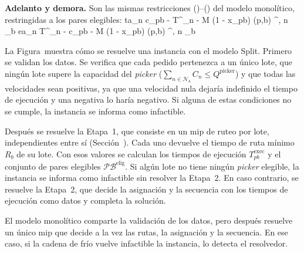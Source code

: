 {\bf Adelanto y demora.}
Son las mismas restricciones ()--()
del modelo monolítico, restringidas a los pares elegibles:
\startplaceformula
\startformula
	\startalign[n=3, align={right,left,left}]
		\NC \NC ta_n \geq c_{pb} - T^{}_n - M (1 - x_{pb}) \NC \qquad \forall (p,b) \in {}^{},\; n \in {}_b 
		\NC \NC ea_n \geq T^{}_n - c_{pb} - M (1 - x_{pb}) \NC \qquad \forall (p,b) \in {}^{},\; n \in {}_b 
	\stopalign
\stopformula
\stopplaceformula

\stopsubsection

\startsubsection[title={Resolución}, reference=sec:split_resolucion]

La Figura~ muestra cómo se resuelve una instancia con el
modelo Split.
Primero se validan los datos. Se verifica que cada pedido pertenezca a un
único lote, que ningún lote supere la capacidad del {\em picker}
($\sum_{n \in \mathcal{N}_b} C_n \leq Q^{\text{picker}}$) y que todas las
velocidades sean positivas, ya que una velocidad nula dejaría indefinido el
tiempo de ejecución y una negativa lo haría negativo. Si alguna de estas
condiciones no se cumple, la instancia se informa como
infactible.

Después se resuelve la Etapa~1, que consiste en un \ac{mip} de ruteo por
lote, independientes entre sí (Sección~). Cada uno
devuelve el tiempo de ruta mínimo $R_b$ de su lote. Con esos valores se
calculan los tiempos de ejecución $T^{\text{exec}}_{pb}$ y el conjunto de
pares elegibles $\mathcal{PB}^{\text{elig}}$. Si algún lote no tiene ningún
{\em picker} elegible, la instancia se informa como infactible sin resolver
la Etapa~2. En caso contrario, se resuelve la Etapa~2, que decide la
asignación y la secuencia con los tiempos de ejecución como datos y completa
la solución.

El modelo monolítico comparte la validación de los datos, pero después
resuelve un único \ac{mip} que decide a la vez las rutas, la asignación y la
secuencia. En ese caso, si la cadena de frío vuelve infactible la instancia,
lo detecta el resolvedor.

